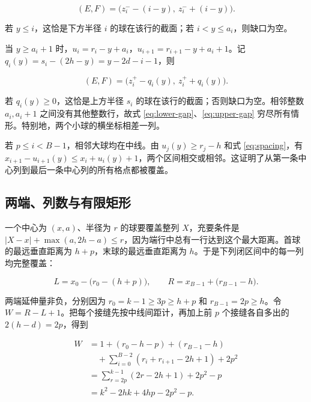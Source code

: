\documentclass[UTF8,a4paper,11pt,fontset=fandol]{ctexart}
\begin{document}
\begin{equation}\label{eq:lower-gap}
(E,F)=\bigl(z_i^{-}-(i-y),\ z_i^{-}+(i-y)\bigr).
\end{equation}

若 $y\le i$，这恰是下方半径 $i$ 的球在该行的截面；若 $i<y\le a_i$，则缺口为空。

当 $y\ge a_i+1$ 时，$u_i=r_i-y+a_i$，$u_{i+1}=r_{i+1}-y+a_i+1$。记 $q_i(y)=s_i-(2h-y)=y-2d-i-1$，则

\begin{equation}\label{eq:upper-gap}
(E,F)=\bigl(z_i^{+}-q_i(y),\ z_i^{+}+q_i(y)\bigr).
\end{equation}

若 $q_i(y)\ge0$，这恰是上方半径 $s_i$ 的球在该行的截面；否则缺口为空。相邻整数 $a_i,a_i+1$ 之间没有其他整数行，故式 \eqref{eq:lower-gap}、\eqref{eq:upper-gap} 穷尽所有情形。特别地，两个小球的横坐标相差一列。

若 $p\le i<B-1$，相邻大球均在中线。由 $u_j(y)\ge r_j-h$ 和式 \eqref{eq:spacing}，有 $x_{i+1}-u_{i+1}(y)\le x_i+u_i(y)+1$，两个区间相交或相邻。这证明了从第一条中心列到最后一条中心列的所有格点都被覆盖。

\subsection{两端、列数与有限矩形}

一个中心为 $(x,a)$、半径为 $r$ 的球要覆盖整列 $X$，充要条件是 $|X-x|+\max(a,2h-a)\le r$，因为端行中总有一行达到这个最大距离。首球的最远垂直距离为 $h+p$，末球的最远垂直距离为 $h$。于是下列闭区间中的每一列均完整覆盖：

\begin{equation}\label{eq:ends}
L=x_0-\bigl(r_0-(h+p)\bigr),\qquad
R=x_{B-1}+\bigl(r_{B-1}-h\bigr).
\end{equation}

两端延伸量非负，分别因为 $r_0=k-1\ge3p\ge h+p$ 和 $r_{B-1}=2p\ge h$。令 $W=R-L+1$。把每个接缝先按中线间距计，再加上前 $p$ 个接缝各自多出的 $2(h-d)=2p$，得到

\begin{equation}\label{eq:width}
\begin{aligned}
W
 &=1+(r_0-h-p)+(r_{B-1}-h)\\
 &\quad+\sum_{i=0}^{B-2}(r_i+r_{i+1}-2h+1)+2p^2\\
 &=\sum_{r=2p}^{k-1}(2r-2h+1)+2p^2-p\\
 &=k^2-2hk+4hp-2p^2-p. 
\end{aligned}
\end{equation}
\end{document}
